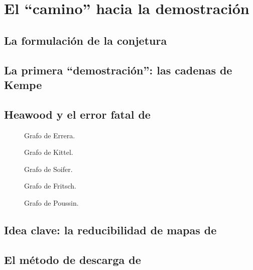 \documentclass[3p,times,a4paper,twocolumn,authoryear]{elsarticle} %
\begin{document}
\section{El ``camino'' hacia la demostración}\label{sec:2}

\subsection{La formulación de la conjetura}\label{sec:2.1}

\subsection{La primera ``demostración'': las cadenas de Kempe}\label{sec:2.2}


\subsection{Heawood y el error fatal de \citeauthor{kempe}}\label{sec:2.3}

\begin{figure}[H]
	\centering
	\scalebox{.3}{}
	\caption{Grafo de Errera.}
\end{figure}

\begin{figure}[H]
	\centering
	\scalebox{.25}{}
	\caption{Grafo de Kittel.}
\end{figure}

\begin{figure}[H]
	\centering
	\scalebox{0.6}{}
	\caption{Grafo de Soifer.}
\end{figure}

\begin{figure}[H]
	\centering
	\scalebox{0.45}{}
	\caption{Grafo de Fritsch.}
\end{figure}

\begin{figure}[H]
	\centering
	\scalebox{0.6}{}
	\caption{Grafo de Poussin.}
\end{figure}

\subsection{Idea clave: la reducibilidad de mapas de \citeauthor{birkhoff}}\label{sec:2.4}

\subsection{El método de descarga de \citeauthor{appel}}\label{sec:2.5}
\end{document}
